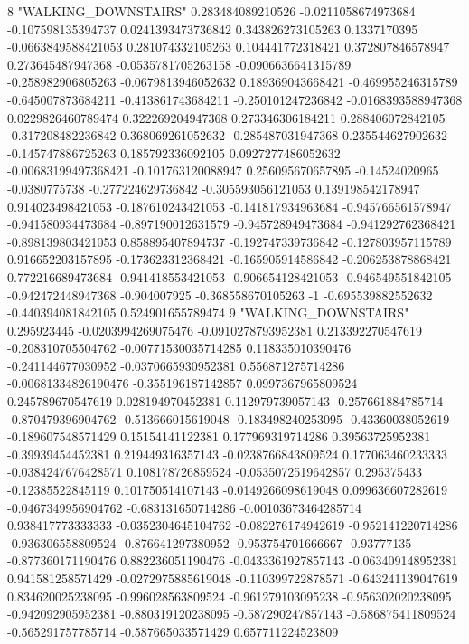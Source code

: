 8 "WALKING_DOWNSTAIRS" 0.283484089210526 -0.0211058674973684 -0.107598135394737 0.0241393473736842 0.343826273105263 0.1337170395 -0.0663849588421053 0.281074332105263 0.104441772318421 0.372807846578947 0.273645487947368 -0.0535781705263158 -0.0906636641315789 -0.258982906805263 -0.0679813946052632 0.189369043668421 -0.469955246315789 -0.645007873684211 -0.413861743684211 -0.250101247236842 -0.0168393588947368 0.0229826460789474 0.322269204947368 0.273346306184211 0.288406072842105 -0.317208482236842 0.368069261052632 -0.285487031947368 0.235544627902632 -0.145747886725263 0.185792336092105 0.0927277486052632 -0.00683199497368421 -0.101763120088947 0.256095670657895 -0.14524020965 -0.0380775738 -0.277224629736842 -0.305593056121053 0.139198542178947 0.914023498421053 -0.187610243421053 -0.141817934963684 -0.945766561578947 -0.941580934473684 -0.897190012631579 -0.945728949473684 -0.941292762368421 -0.898139803421053 0.858895407894737 -0.192747339736842 -0.127803957115789 0.916652203157895 -0.173623312368421 -0.165905914586842 -0.206253878868421 0.772216689473684 -0.941418553421053 -0.906654128421053 -0.946549551842105 -0.942472448947368 -0.904007925 -0.368558670105263 -1 -0.695539882552632 -0.440394081842105 0.524901655789474
9 "WALKING_DOWNSTAIRS" 0.295923445 -0.0203994269075476 -0.0910278793952381 0.213392270547619 -0.208310705504762 -0.00771530035714285 0.118335010390476 -0.241144677030952 -0.0370665930952381 0.556871275714286 -0.00681334826190476 -0.355196187142857 0.0997367965809524 0.245789670547619 0.028194970452381 0.112979739057143 -0.257661884785714 -0.870479396904762 -0.513666015619048 -0.183498240253095 -0.43360038052619 -0.189607548571429 0.15154141122381 0.177969319714286 0.39563725952381 -0.39939454452381 0.219449316357143 -0.0238766843809524 0.177063460233333 -0.0384247676428571 0.108178726859524 -0.0535072519642857 0.295375433 -0.12385522845119 0.101750514107143 -0.0149266098619048 0.099636607282619 -0.0467349956904762 -0.683131650714286 -0.00103673464285714 0.938417773333333 -0.0352304645104762 -0.082276174942619 -0.952141220714286 -0.936306558809524 -0.876641297380952 -0.953754701666667 -0.93777135 -0.877360171190476 0.882236051190476 -0.0433361927857143 -0.063409148952381 0.941581258571429 -0.0272975885619048 -0.110399722878571 -0.643241139047619 0.834620025238095 -0.996028563809524 -0.961279103095238 -0.956302020238095 -0.942092905952381 -0.880319120238095 -0.587290247857143 -0.586875411809524 -0.565291757785714 -0.587665033571429 0.657711224523809
